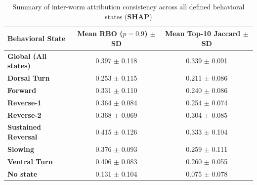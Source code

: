 \documentclass{article}
\begin{document}
\begin{table}[H]
    \centering
    \renewcommand{\arraystretch}{1.3} 
    \begin{tabular}{l c c}
        \toprule
        \textbf{Behavioral State} & \textbf{Mean RBO ($p=0.9$) $\pm$ SD} & \textbf{Mean Top-10 Jaccard $\pm$ SD} \\
        \midrule
        \textbf{Global (All states)} & 0.397 $\pm$ 0.118 & 0.339 $\pm$ 0.091 \\
        \textbf{Dorsal Turn}         & 0.253 $\pm$ 0.115 & 0.211 $\pm$ 0.086 \\
        \textbf{Forward}             & 0.331 $\pm$ 0.110 & 0.240 $\pm$ 0.086 \\
        \textbf{Reverse-1}           & 0.364 $\pm$ 0.084 & 0.254 $\pm$ 0.074 \\
        \textbf{Reverse-2}           & 0.368 $\pm$ 0.069 & 0.304 $\pm$ 0.085 \\
        \textbf{Sustained Reversal}  & 0.415 $\pm$ 0.126 & 0.333 $\pm$ 0.104 \\
        \textbf{Slowing}             & 0.376 $\pm$ 0.093 & 0.259 $\pm$ 0.111 \\
        \textbf{Ventral Turn}        & 0.406 $\pm$ 0.083 & 0.260 $\pm$ 0.055 \\
        \textbf{No state}            & 0.131 $\pm$ 0.104 & 0.075 $\pm$ 0.078 \\
        \bottomrule
    \end{tabular}
    \caption{Summary of inter-worm attribution consistency across all defined behavioral states (\textbf{SHAP})}
    \label{tab:inter_worm_summary_I}
\end{table}
\end{document}
